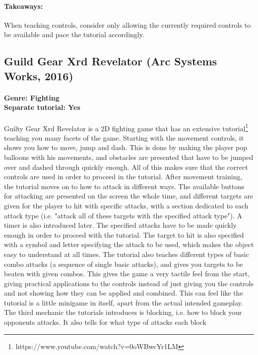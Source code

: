 \paragraph{Takeaways:}
When teaching controls, consider only allowing the currently required controls to be available and pace the tutorial accordingly.

\subsection{Guild Gear Xrd Revelator (Arc Systems Works, 2016)}
\paragraph{Genre: Fighting \\ Separate tutorial: Yes \\}
Guilty Gear Xrd Revelator is a 2D fighting game that has an extensive tutorial\footnote{https://www.youtube.com/watch?v=0oWBwcYr1LM}
teaching you many facets of the game. Starting with the movement controls, it
shows you how to move, jump and dash. This is done by making the player pop
balloons with his movements, and obstacles are presented that have to be
jumped over and dashed through quickly enough. All of this makes sure that the correct controls are used in
order to proceed in the tutorial.
After movement training, the tutorial moves on to how to attack in different
ways. The available buttons for attacking are presented on the screen the
whole time, and different targets are given for the player to hit with
specific attacks, with a section dedicated to each attack type (i.e. "attack
all of these targets with the specified attack type"). A timer is also
introduced later. The specified attacks have to be made quickly enough in
order to proceed with the tutorial. The target to hit is also specified with a
symbol and letter specifying the attack to be used, which makes the object
easy to understand at all times. The tutorial also teaches different types of
basic combo attacks (a sequence of single basic attacks), and gives you targets to be beaten with given combos.
This gives the game a very tactile feel from the start, giving practical
applications to the controls instead of just giving you the controls and not
showing how they can be applied and combined. This can feel like the tutorial is a little
minigame in itself, apart from the actual intended gameplay.
The third mechanic the tutorials introduces is blocking, i.e. how to block
your opponents attacks. It also tells for what type of attacks each block
